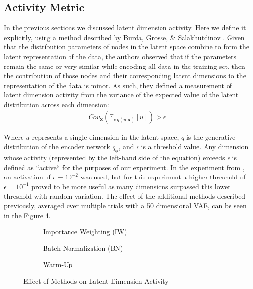 \documentclass{article} %
\numberwithin{figure}{section}
\begin{document}
\subsection{Activity Metric}
In the previous sections we discussed latent dimension activity. Here we define it explicitly, using a method described by Burda, Grosse, \& Salakhutdinov \cite{Burda2016}. Given that the distribution parameters of nodes in the latent space combine to form the latent representation of the data, the authors observed that if the parameters remain the same or very similar while encoding  all data in the training set, then the contribution of those nodes and their corresponding latent dimensions to the representation of the data is minor. As such, they defined a measurement of latent dimension activity from the variance of the expected value of the latent distribution across each dimension:
\begin{align}
  Cov_{\textbf{x}}\left(\mathbb{E}_{u~q(u|\textbf{x})}[u]\right)>\epsilon
  \label{eq:ACTIVITYMET}
\end{align}
\par Where $u$ represents a single dimension in the latent space, $q$ is the generative distribution of the encoder network $q_\phi$, and $\epsilon$ is a threshold value. Any dimension whose activity (represented by the left-hand side of the equation) exceeds $\epsilon$ is defined as ``active`` for the purposes of our experiment. In the experiment from \cite{Burda2016}, an activation of $\epsilon=10^{-2}$ was used, but for this experiment a higher threshold of $\epsilon=10^{-1}$ proved to be more useful as many dimensions surpassed this lower threshold with random variation. The effect of the additional methods described previously, averaged over multiple trials with a 50 dimensional VAE, can be seen in the Figure \ref{fig:activities}.
\begin{figure}[h]
\captionsetup[subfigure]{justification=centering}
  \centering
  \begin{subfigure}[t]{0.3\textwidth}
    \resizebox{\linewidth}{!}{}
    \caption{Importance Weighting (IW)}
    \label{fig:iwlat}
  \end{subfigure}
  \begin{subfigure}[t]{0.3\textwidth}
    \resizebox{\linewidth}{!}{}
    \caption{Batch Normalization (BN)}
    \label{fig:bnlat}
  \end{subfigure}
  \begin{subfigure}[t]{0.3\textwidth}
    \resizebox{\linewidth}{!}{}
    \caption{Warm-Up}
    \label{fig:wulat}
  \end{subfigure}
  \caption{Effect of Methods on Latent Dimension Activity}
  \label{fig:activities}
\end{figure}
\end{document}

